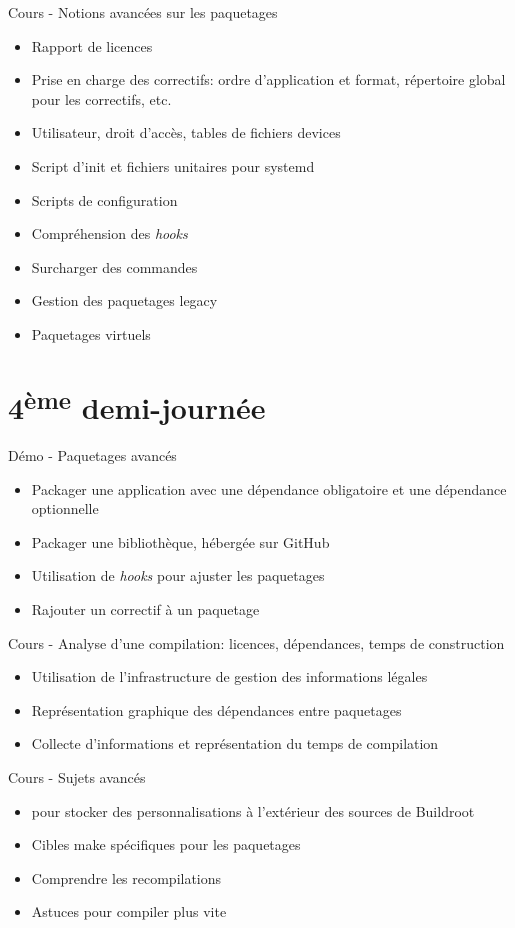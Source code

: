 \documentclass[a4paper,12pt,obeyspaces,spaces,hyphens]{article}
\begin{document}
\feagendaonecolumn
{Cours - Notions avancées sur les paquetages}
{
  \begin{itemize}
  \item Rapport de licences
  \item Prise en charge des correctifs: ordre d'application et format,
	répertoire global pour les correctifs, etc.
  \item Utilisateur, droit d'accès, tables de fichiers devices
  \item Script d'init et fichiers unitaires pour systemd
  \item Scripts de configuration
  \item Compréhension des {\em hooks}
  \item Surcharger des commandes
  \item Gestion des paquetages legacy
  \item Paquetages virtuels
  \end{itemize}
}

\section{4\textsuperscript{ème} demi-journée}

\feagendaonecolumn
{Démo - Paquetages avancés}
{
  \begin{itemize}
  \item Packager une application avec une dépendance obligatoire et
    une dépendance optionnelle
  \item Packager une bibliothèque, hébergée sur GitHub
  \item Utilisation de {\em hooks} pour ajuster les paquetages
  \item Rajouter un correctif à un paquetage
  \end{itemize}
}

\feagendatwocolumn
{Cours - Analyse d'une compilation: licences, dépendances, temps de
construction}
{
  \begin{itemize}
  \item Utilisation de l'infrastructure de gestion des informations
	légales
  \item Représentation graphique des dépendances entre paquetages
  \item Collecte d'informations et représentation du temps de
	compilation
  \end{itemize}
}
{Cours - Sujets avancés}
{
  \begin{itemize}
  \item {} pour stocker des personnalisations à
	l'extérieur des sources de Buildroot
  \item Cibles make spécifiques pour les paquetages
  \item Comprendre les recompilations
  \item Astuces pour compiler plus vite
  \end{itemize}
}
\end{document}
